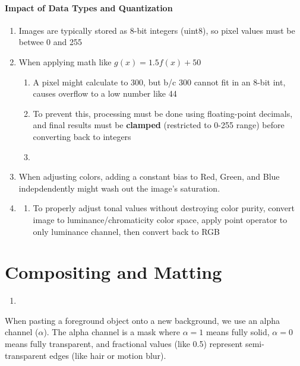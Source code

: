 \documentclass[12pt]{article}
\begin{document}
\paragraph{Impact of Data Types and Quantization}

\begin{enumerate}
    \item Images are typically stored as 8-bit integers (uint8), so pixel values must be betwee 0 and 255
    \item When applying math like $g(x) = 1.5 f(x) + 50$
          \begin{enumerate}
              \item A pixel might calculate to 300, but b/c 300 cannot fit in an 8-bit int, causes overflow to a low number like 44
              \item To prevent this, processing must be done using floating-point decimals, and final results must be \textbf{clamped} (restricted to 0-255 range) before converting back to integers
              \item
          \end{enumerate}
    \item When adjusting colors, adding a constant bias to Red, Green, and Blue indepdendently might wash out the image's saturation.
    \item \begin{enumerate}
              \item To properly adjust tonal values without destroying color purity, convert image to luminance/chromaticity color space, apply point operator to only luminance channel, then convert back to RGB
          \end{enumerate}
\end{enumerate}


\section{Compositing and Matting}

\begin{enumerate}
    \item
\end{enumerate}


When pasting a foreground object onto a new background, we use an alpha channel ($\alpha$). The alpha channel is a mask where $\alpha = 1$ means fully solid, $\alpha = 0$ means fully transparent, and fractional values (like 0.5) represent semi-transparent edges (like hair or motion blur).
\end{document}
